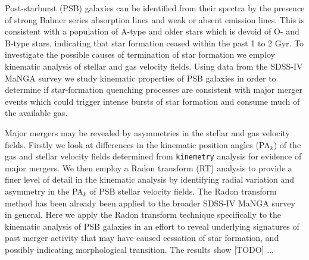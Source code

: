 
Post-starburst (PSB) galaxies can be identified from their spectra by the presence of strong Balmer series absorption lines and weak or absent emission lines. This is consistent with a population of A-type and older stars which is devoid of O- and B-type stars, indicating that star formation ceased within the past 1 to 2 Gyr. To investigate the possible causes of termination of star formation we employ kinematic analysis of stellar and gas velocity fields. Using data from the SDSS-IV MaNGA survey we study  kinematic properties of PSB galaxies in order to determine if star-formation quenching processes are consistent with major merger events which could trigger intense bursts of star formation and  consume much of the available gas. 

Major mergers may be revealed by asymmetries in the stellar and gas velocity fields. Firstly we look at differences in the kinematic position angles (PA$_{k}$) of the gas and stellar velocity fields determined from \texttt{kinemetry} analysis for evidence of major mergers. We then employ a Radon transform (RT) analysis to provide a finer level of detail in the kinematic analysis by identifying radial variation and asymmetry in the PA$_{k}$ of PSB stellar velocity fields. The Radon transform method has been already been applied to the broader SDSS-IV MaNGA survey in general. Here we apply the Radon transform technique specifically to the kinematic analysis of PSB galaxies in an effort to reveal underlying signatures of past merger activity that may have caused cessation of star formation, and possibly indicating morphological transition. The results show [TODO] ... 


